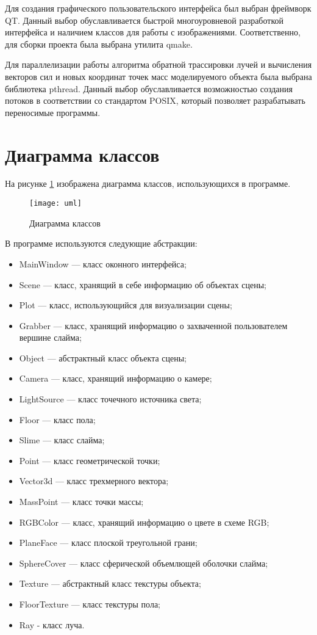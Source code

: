 Для создания графического пользовательского интерфейса был выбран фреймворк QT. Данный выбор обуславливается быстрой многоуровневой разработкой интерфейса и наличием классов для работы с изображениями. Соответственно, для сборки проекта была выбрана утилита qmake.

Для параллелизации работы алгоритма обратной трассировки лучей и вычисления векторов сил и новых координат точек масс моделируемого объекта была выбрана библиотека pthread. Данный выбор обуславливается возможностью создания потоков в соответствии со стандартом POSIX, который позволяет разрабатывать переносимые программы.

\section{Диаграмма классов}

На рисунке \ref{uml} изображена диаграмма классов, использующихся в программе.

\begin{figure}[h!]
	\centering
	\texttt{[image: uml]}
	\caption{Диаграмма классов}
	\label{uml}
\end{figure}

В программе используются следующие абстракции:

\begin{itemize}
	\item MainWindow --- класс оконного интерфейса;
	\item Scene --- класс, хранящий в себе информацию об объектах сцены;
	\item Plot --- класс, использующийся для визуализации сцены;
	\item Grabber --- класс, хранящий информацию о захваченной пользователем вершине слайма;
	\item Object --- абстрактный класс объекта сцены;
	\item Camera --- класс, хранящий информацию о камере;
	\item LightSource --- класс точечного источника света;
	\item Floor --- класс пола;
	\item Slime --- класс слайма;
	\item Point --- класс геометрической точки;
	\item Vector3d --- класс трехмерного вектора;
	\item MassPoint --- класс точки массы;
	\item RGBColor --- класс, хранящий информацию о цвете в схеме RGB;
	\item PlaneFace --- класс плоской треугольной грани;
	\item SphereCover --- класс сферической объемлющей оболочки слайма;
	\item Texture --- абстрактный класс текстуры объекта;
	\item FloorTexture --- класс текстуры пола;
	\item Ray - класс луча.
\end{itemize}

